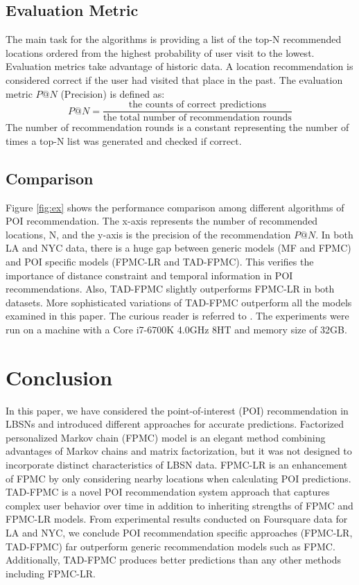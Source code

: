 \documentclass{sig-alternate}
\begin{document}
\subsection{Evaluation Metric}
\label{metic}
The main task for the algorithms is providing a list of the top-N recommended locations
ordered from the highest probability of user visit to the lowest. Evaluation metrics take advantage of historic data.  
A location recommendation is considered correct if the user had visited that place in the past. 
The evaluation metric $P@N$ (Precision) is defined as:
\begin{equation}
	P@N = \frac{\textrm{the counts of correct predictions}} {\textrm{the total number of recommendation rounds}}
\label{eq:P@N}
\end{equation}
The number of recommendation rounds is a constant representing the number of times a top-N list was 
generated and checked if correct.

\subsection{Comparison}
\label{comparison}
Figure \ref{fig:ex} shows the performance comparison among different algorithms of POI recommendation. 
The x-axis represents the number of recommended locations, N, and the y-axis 
is the precision of the recommendation $P@N$. In both LA and NYC data, there is a huge gap 
between generic models (MF and FPMC) and POI specific models (FPMC-LR and TAD-FPMC). 
This verifies the importance of distance constraint and temporal information in POI recommendations. 
Also, TAD-FPMC slightly outperforms FPMC-LR in both datasets. More sophisticated variations of TAD-FPMC outperform 
all the models examined in this paper. The curious reader is referred to \cite{Li:2017}.
The experiments were run on a machine with a Core i7-6700K 4.0GHz 8HT and memory size of 32GB. \cite{Li:2017} 

\section{Conclusion}
\label{sec:conclusion}

In this paper, we have considered the point-of-interest (POI) recommendation in LBSNs 
and introduced different approaches for accurate predictions. Factorized personalized Markov 
chain (FPMC) model is an elegant method combining advantages of Markov chains and matrix factorization,
but it was not designed to incorporate distinct characteristics of LBSN data. FPMC-LR is an enhancement 
of FPMC by only considering nearby locations when calculating POI predictions. TAD-FPMC is a novel 
POI recommendation system approach that captures complex user behavior over time in addition to inheriting strengths 
of FPMC and FPMC-LR models. From experimental results conducted on Foursquare data for LA and NYC, we conclude 
POI recommendation specific approaches (FPMC-LR, TAD-FPMC) far outperform generic recommendation models such as FPMC.
Additionally, TAD-FPMC produces better predictions than any other methods including FPMC-LR.
\end{document}
